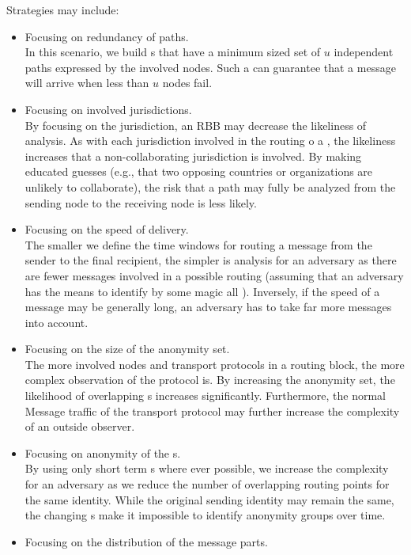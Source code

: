 Strategies may include:
\begin{itemize}
	\item Focusing on redundancy of paths.\\
	      In this scenario, we build s that have a minimum sized set of $u$ independent paths expressed by the involved nodes. Such a  can guarantee that a message will arrive when less than $u$ nodes fail.
	\item Focusing on involved jurisdictions.\\
	      By focusing on the jurisdiction, an RBB may decrease the likeliness of analysis. As with each jurisdiction involved in the routing o a \VortexMessage{}, the likeliness increases that a non-collaborating jurisdiction is involved. By making educated guesses (e.g., that two opposing countries or organizations are unlikely to collaborate), the risk that a path may fully be analyzed from the sending node to the receiving node is less likely.
	\item Focusing on the speed of delivery.\\
	      The smaller we define the time windows for routing a message from the sender to the final recipient, the simpler is analysis for an adversary as there are fewer messages involved in a possible routing (assuming that an adversary has the means to identify by some magic all \VortexMessages). Inversely, if the speed of a message may be generally long, an adversary has to take far more messages into account.
	\item Focusing on the size of the anonymity set.\\
	      The more involved nodes and transport protocols in a routing block, the more complex observation of the protocol is. By increasing the anonymity set, the likelihood of overlapping s increases significantly. Furthermore, the normal Message traffic of the transport protocol may further increase the complexity of an outside observer.
	\item Focusing on anonymity of the s.\\
	      By using only short term s where ever possible, we increase the complexity for an adversary as we reduce the number of overlapping routing points for the same identity. While the original sending identity may remain the same, the changing s make it impossible to identify anonymity groups over time.
	\item Focusing on the distribution of the message parts.\\

\end{itemize}
